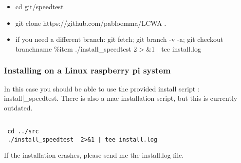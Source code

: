 \documentclass[12pt]{article}
\begin{document}
\begin{itemize}
\item cd git/speedtest
\item git clone https://github.com/pabloemma/LCWA .
\item if you need a different branch: git fetch; git branch -v -a; git checkout branchname
\%item ./install\_speedtest  2$>$\&1 $|$ tee install.log

\end{itemize}

\vspace{3cm}

\subsubsection{Installing on a Linux raspberry pi system}
In this case you should be able to use the provided install script : install|\_speedtest. There is also a mac installation script, but this is currently outdated.
\begin{verbatim}

 cd ../src
 ./install_speedtest  2>&1 | tee install.log
\end{verbatim}

If the installation crashes, please send me the install.log file.
\end{document}
